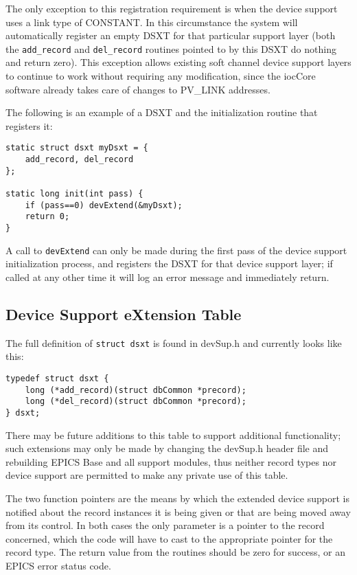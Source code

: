 The only exception to this registration requirement is when the device support uses a link type of CONSTANT.  In this 
circumstance the system will automatically register an empty DSXT for that particular support layer (both the 
\verb|add_record| and \verb|del_record| routines pointed to by this DSXT do nothing and return zero). This exception allows 
existing soft channel device support layers to continue to work without requiring any modification, since the iocCore 
software already takes care of changes to PV\_LINK addresses.

The following is an example of a DSXT and the initialization routine that registers it:

\begin{verbatim}static struct dsxt myDsxt = {
    add_record, del_record
};

static long init(int pass) {
    if (pass==0) devExtend(&myDsxt);
    return 0;
}
\end{verbatim}A call to \verb|devExtend| can only be made during the first pass of the device support initialization process, and registers the 
DSXT for that device support layer; if called at any other time it will log an error message and immediately return.

\subsection{Device Support eXtension Table}

The full definition of \verb|struct dsxt| is found in devSup.h and currently looks like this:

\begin{verbatim}typedef struct dsxt {
    long (*add_record)(struct dbCommon *precord);
    long (*del_record)(struct dbCommon *precord);
} dsxt;
\end{verbatim}There may be future additions to this table to support additional functionality; such extensions may only be made by 
changing the devSup.h header file and rebuilding EPICS Base and all support modules, thus neither record types nor 
device support are permitted to make any private use of this table.

The two function pointers are the means by which the extended device support is notified about the record instances it is 
being given or that are being moved away from its control. In both cases the only parameter is a pointer to the record 
concerned, which the code will have to cast to the appropriate pointer for the record type. The return value from the 
routines should be zero for success, or an EPICS error status code.

